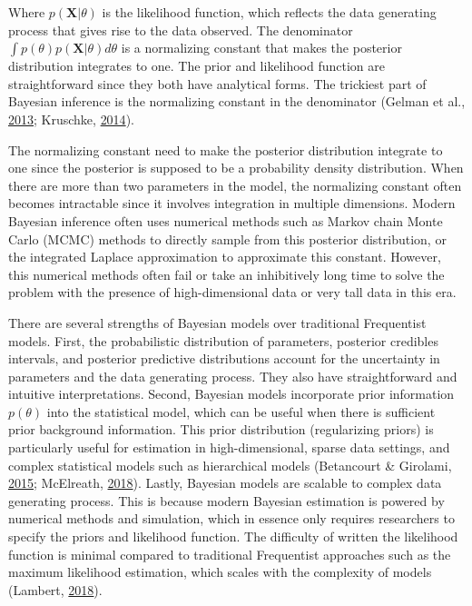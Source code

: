 \documentclass[12pt]{book}
\numberwithin{equation}{chapter}
\begin{document}
Where \(p(\mathbf{X}|\theta)\) is the likelihood function, which reflects the data generating process that gives rise to the data observed. The denominator \(\int p(\theta)p(\mathbf{X}|\theta)d\theta\) is a normalizing constant that makes the posterior distribution integrates to one. The prior and likelihood function are straightforward since they both have analytical forms. The trickiest part of Bayesian inference is the normalizing constant in the denominator (Gelman et al., \protect\hyperlink{ref-gelman2013bayesian}{2013}; Kruschke, \protect\hyperlink{ref-kruschke2014doing}{2014}).

The normalizing constant need to make the posterior distribution integrate to one since the posterior is supposed to be a probability density distribution. When there are more than two parameters in the model, the normalizing constant often becomes intractable since it involves integration in multiple dimensions. Modern Bayesian inference often uses numerical methods such as Markov chain Monte Carlo (MCMC) methods to directly sample from this posterior distribution, or the integrated Laplace approximation to approximate this constant. However, this numerical methods often fail or take an inhibitively long time to solve the problem with the presence of high-dimensional data or very tall data in this era.

There are several strengths of Bayesian models over traditional Frequentist models. First, the probabilistic distribution of parameters, posterior credibles intervals, and posterior predictive distributions account for the uncertainty in parameters and the data generating process. They also have straightforward and intuitive interpretations. Second, Bayesian models incorporate prior information \(p(\theta)\) into the statistical model, which can be useful when there is sufficient prior background information. This prior distribution (regularizing priors) is particularly useful for estimation in high-dimensional, sparse data settings, and complex statistical models such as hierarchical models (Betancourt \& Girolami, \protect\hyperlink{ref-betancourt2015hamiltonian}{2015}; McElreath, \protect\hyperlink{ref-mcelreath2018statistical}{2018}). Lastly, Bayesian models are scalable to complex data generating process. This is because modern Bayesian estimation is powered by numerical methods and simulation, which in essence only requires researchers to specify the priors and likelihood function. The difficulty of written the likelihood function is minimal compared to traditional Frequentist approaches such as the maximum likelihood estimation, which scales with the complexity of models (Lambert, \protect\hyperlink{ref-lambert2018student}{2018}).
\end{document}
